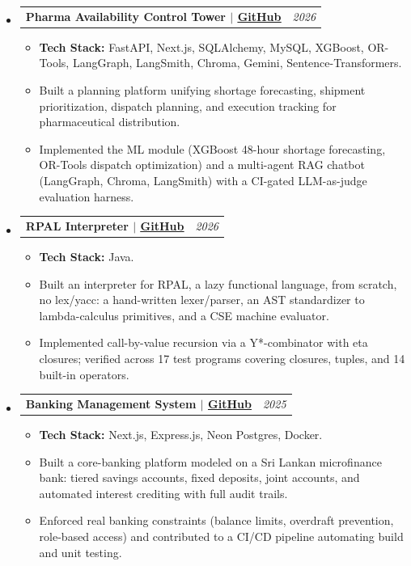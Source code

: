 \documentclass[a4paper,10pt]{article}
\makeatletter
\newcommand{\resumeItem}[1]{\item\small{#1}}
\newcommand{\resumeProjectHeading}[2]{
  \vspace{-1pt}\item
    \begin{tabular*}{0.97\textwidth}{l@{\extracolsep{\fill}}r}
      \textbf{#1} & \textit{\small #2} \\
    \end{tabular*}\vspace{-5pt}
}
\makeatother
\begin{document}
\begin{itemize}[leftmargin=0.15in, label={}]
\begin{itemize}[leftmargin=0.15in, label={\tiny$\bullet$}]
      \end{itemize}
    \resumeProjectHeading
      {Pharma Availability Control Tower  $|$ \href{https://github.com/JPabasara/pharma-availability-control-tower}{\underline{GitHub}}}{2026}
      \begin{itemize}[leftmargin=0.15in, label={\tiny$\bullet$}]
        \resumeItem{\textbf{Tech Stack:} FastAPI, Next.js, SQLAlchemy, MySQL, XGBoost, OR-Tools, LangGraph, LangSmith, Chroma, Gemini, Sentence-Transformers.}
        \resumeItem{Built a planning platform unifying shortage forecasting, shipment prioritization, dispatch planning, and execution tracking for pharmaceutical distribution.}
        \resumeItem{Implemented the ML module (XGBoost 48-hour shortage forecasting, OR-Tools dispatch optimization) and a multi-agent RAG chatbot (LangGraph, Chroma, LangSmith) with a CI-gated LLM-as-judge evaluation harness.}
      \end{itemize}
    \resumeProjectHeading
      {RPAL Interpreter  $|$ \href{https://github.com/Jaybro-git/RPAL}{\underline{GitHub}}}{2026}
      \begin{itemize}[leftmargin=0.15in, label={\tiny$\bullet$}]
        \resumeItem{\textbf{Tech Stack:} Java.}
        \resumeItem{Built an interpreter for RPAL, a lazy functional language, from scratch, no lex/yacc: a hand-written lexer/parser, an AST standardizer to lambda-calculus primitives, and a CSE machine evaluator.}
        \resumeItem{Implemented call-by-value recursion via a Y*-combinator with eta closures; verified across 17 test programs covering closures, tuples, and 14 built-in operators.}
      \end{itemize}
    \resumeProjectHeading
      {Banking Management System  $|$ \href{https://github.com/Jaybro-git/Banking-Management-System.git}{\underline{GitHub}}}{2025}
      \begin{itemize}[leftmargin=0.15in, label={\tiny$\bullet$}]
        \resumeItem{\textbf{Tech Stack:} Next.js, Express.js, Neon Postgres, Docker.}
        \resumeItem{Built a core-banking platform modeled on a Sri Lankan microfinance bank: tiered savings accounts, fixed deposits, joint accounts, and automated interest crediting with full audit trails.}
        \resumeItem{Enforced real banking constraints (balance limits, overdraft prevention, role-based access) and contributed to a CI/CD pipeline automating build and unit testing.}
      \end{itemize}
\end{itemize}
\end{document}
